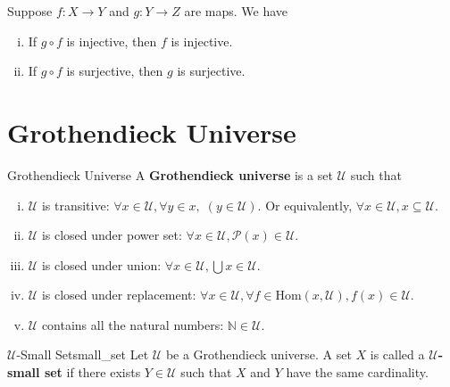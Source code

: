 \begin{proposition}{}{}
    Suppose $f:X\to Y$ and $g:Y\to Z$ are maps. We have
    \begin{enumerate}[(i)]
        \item If $g\circ f$ is injective, then $f$ is injective.
        \item If $g\circ f$ is surjective, then $g$ is surjective.
    \end{enumerate}
\end{proposition}


\section{Grothendieck Universe}
\begin{definition}{Grothendieck Universe}{}
    A \textbf{Grothendieck universe} is a set $\mathscr{U}$ such that
    \begin{enumerate}[(i)]
        \item $\mathscr{U}$ is transitive: $\forall x\in \mathscr{U},\forall y\in x, \;\left(y\in \mathscr{U}\right)$. Or equivalently, $\forall x\in \mathscr{U}, x\subseteq \mathscr{U}$.
        \item $\mathscr{U}$ is closed under power set: $\forall x\in \mathscr{U}, \mathscr{P}(x)\in \mathscr{U}$.
        \item $\mathscr{U}$ is closed under union: $\forall x\in \mathscr{U},\bigcup x\in \mathscr{U}$.
        \item $\mathscr{U}$ is closed under replacement: $\forall x\in \mathscr{U},\forall f\in \mathrm{Hom}(x,\mathscr{U}), f(x)\in \mathscr{U}$.
        \item $\mathscr{U}$ contains all the natural numbers: $\mathbb{N}\in \mathscr{U}$.
    \end{enumerate}
\end{definition}

\begin{definition}{$\mathscr{U}$-Small Set}{small_set}
    Let $\mathscr{U}$ be a Grothendieck universe. A set $X$ is called a \textbf{$\mathscr{U}$-small set} if there exists $Y\in \mathscr{U}$ such that $X$ and $Y$ have the same cardinality.
\end{definition}
